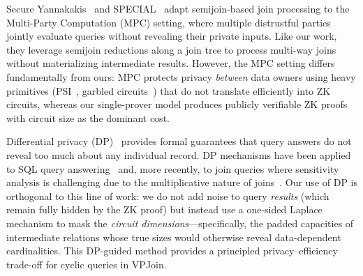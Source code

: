 \documentclass[sigconf]{acmart}
\renewcommand{\emph}[1]{\textit{#1}}
\begin{document}

Secure Yannakakis~\cite{wang2021secure} and SPECIAL~\cite{wang2024special} adapt semijoin-based join processing to the Multi-Party Computation (MPC) setting, where multiple distrustful parties jointly evaluate queries without revealing their private inputs. Like our work, they leverage semijoin reductions along a join tree to process multi-way joins without materializing intermediate results. However, the MPC setting differs fundamentally from ours: MPC protects privacy \emph{between} data owners using heavy primitives (PSI~\cite{pinkas2019efficient}, garbled circuits~\cite{yao1986generate}) that do not translate efficiently into ZK circuits, whereas our single-prover model produces publicly verifiable ZK proofs with circuit size as the dominant cost.

Differential privacy (DP)~\cite{dwork2006differential,dwork2014algorithmic} provides formal guarantees that query answers do not reveal too much about any individual record. DP mechanisms have been applied to SQL query answering~\cite{mcsherry2009pinq, johnson2018towards} and, more recently, to join queries where sensitivity analysis is challenging due to the multiplicative nature of joins~\cite{dong2021residual,dong2024continual}. Our use of DP is orthogonal to this line of work: we do not add noise to query \emph{results} (which remain fully hidden by the ZK proof) but instead use a one-sided Laplace mechanism to mask the \emph{circuit dimensions}---specifically, the padded capacities of intermediate relations whose true sizes would otherwise reveal data-dependent cardinalities. This DP-guided method provides a principled privacy--efficiency trade-off for cyclic queries in VPJoin.
\end{document}
